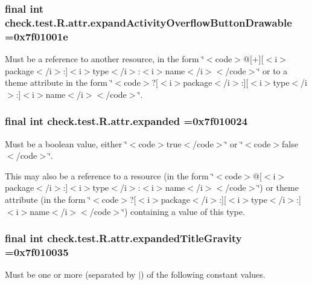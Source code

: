 \subsubsection[{expand\+Activity\+Overflow\+Button\+Drawable}]{\setlength{\rightskip}{0pt plus 5cm}final int check.\+test.\+R.\+attr.\+expand\+Activity\+Overflow\+Button\+Drawable =0x7f01001e\hspace{0.3cm}{\ttfamily [static]}}\label{classcheck_1_1test_1_1_r_1_1attr_a4e579a55463671fe043ac88526bf948b}
Must be a reference to another resource, in the form \char`\"{}$<$code$>$@\mbox{[}+\mbox{]}\mbox{[}$<$i$>$package$<$/i$>$\+:\mbox{]}$<$i$>$type$<$/i$>$\+:$<$i$>$name$<$/i$>$$<$/code$>$\char`\"{} or to a theme attribute in the form \char`\"{}$<$code$>$?\mbox{[}$<$i$>$package$<$/i$>$\+:\mbox{]}\mbox{[}$<$i$>$type$<$/i$>$\+:\mbox{]}$<$i$>$name$<$/i$>$$<$/code$>$\char`\"{}. \hypertarget{classcheck_1_1test_1_1_r_1_1attr_a92c0bde20e9439237e08ad4232347c4a}{}
\subsubsection[{expanded}]{\setlength{\rightskip}{0pt plus 5cm}final int check.\+test.\+R.\+attr.\+expanded =0x7f010024\hspace{0.3cm}{\ttfamily [static]}}\label{classcheck_1_1test_1_1_r_1_1attr_a92c0bde20e9439237e08ad4232347c4a}
Must be a boolean value, either \char`\"{}$<$code$>$true$<$/code$>$\char`\"{} or \char`\"{}$<$code$>$false$<$/code$>$\char`\"{}. 

This may also be a reference to a resource (in the form \char`\"{}$<$code$>$@\mbox{[}$<$i$>$package$<$/i$>$\+:\mbox{]}$<$i$>$type$<$/i$>$\+:$<$i$>$name$<$/i$>$$<$/code$>$\char`\"{}) or theme attribute (in the form \char`\"{}$<$code$>$?\mbox{[}$<$i$>$package$<$/i$>$\+:\mbox{]}\mbox{[}$<$i$>$type$<$/i$>$\+:\mbox{]}$<$i$>$name$<$/i$>$$<$/code$>$\char`\"{}) containing a value of this type. \hypertarget{classcheck_1_1test_1_1_r_1_1attr_ae2a60d204e002a5afb562ba3ba1fcd22}{}
\subsubsection[{expanded\+Title\+Gravity}]{\setlength{\rightskip}{0pt plus 5cm}final int check.\+test.\+R.\+attr.\+expanded\+Title\+Gravity =0x7f010035\hspace{0.3cm}{\ttfamily [static]}}\label{classcheck_1_1test_1_1_r_1_1attr_ae2a60d204e002a5afb562ba3ba1fcd22}
Must be one or more (separated by \textquotesingle{}$\vert$\textquotesingle{}) of the following constant values.

